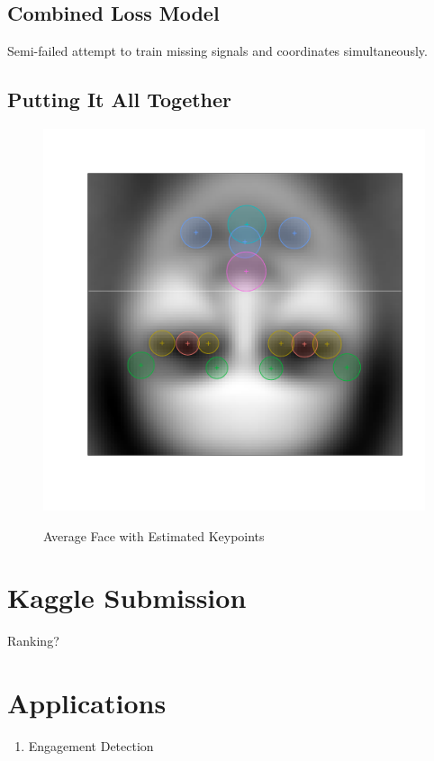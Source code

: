 \documentclass[journal]{IEEEtran}
\begin{document}


\subsection{Combined Loss Model}
Semi-failed attempt to train missing signals and coordinates simultaneously.

\subsection{Putting It All Together}

\begin{figure}[!htb]
  \centering
  \caption{Average Face with Estimated Keypoints}
  \includegraphics[scale=.5]{avg_face_rmse.pdf}
  \label{fig:avg_face_rmse}
\end{figure}

\section{Kaggle Submission}
Ranking?

\section{Applications}
\begin{enumerate}
\item Engagement Detection
\end{enumerate}

\medskip


% 

\end{document}
